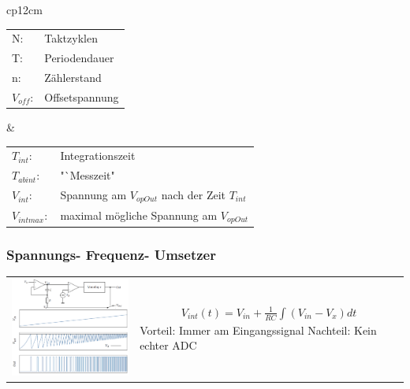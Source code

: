\begin{longtable}{cp{12cm}}
  
  \begin{tabular}{ll}
      N:&Taktzyklen\\
      T:&Periodendauer\\
      n:&Zählerstand\\
      $V_{off}$:&Offsetspannung\\
  \end{tabular}
  &
  
  \begin{tabular}{ll}
      $T_{int}$:&Integrationszeit\\
      $T_{abint}$:& "`Messzeit"\\
      $V_{int}$:&Spannung am $V_{opOut}$ nach der Zeit $T_{int}$\\
      $V_{intmax}:$&maximal mögliche Spannung am $V_{opOut}$\\
  \end{tabular}
\end{longtable}

\subsubsection{Spannungs- Frequenz- Umsetzer }
\begin{tabular}{cp{12cm}}
  \includegraphics[width=6cm, valign=t]{pictures/sfu}
  &
    {\begin{align*}
      V_{int}(t)=V_{in}+\frac{1}{RC}\int(V_{in}-V_{x})dt
    \end{align*}
    Vorteil: Immer am Eingangssignal\newline
    Nachteil: Kein echter ADC}\\
\end{tabular}


